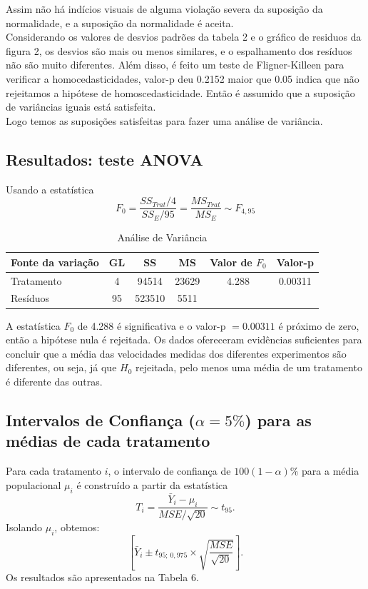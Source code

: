 \documentclass[12pt]{article}
\begin{document}
Assim não há indícios visuais de alguma violação severa da suposição da normalidade, e a suposição da normalidade é aceita.\\
Considerando os valores de desvios padrões da tabela 2 e o gráfico de residuos da figura 2, 
os desvios são mais ou menos similares, e o espalhamento dos resíduos não são muito diferentes.
Além disso, é feito um teste de Fligner-Killeen para verificar a homocedasticidades, valor-p deu 0.2152 maior que 0.05 indica que não rejeitamos a hipótese de homoscedasticidade.
Então é assumido que a suposição de variâncias iguais está satisfeita.
\\
Logo temos as suposições satisfeitas para fazer uma análise de variância. 

\subsection*{Resultados: teste ANOVA}
Usando a estatística 
    \[
    F_0 = \frac{SS_{Trat}/4}{SS_{E}/95} = \frac{MS_{Trat}}{MS_{E}} \sim F_{4,95}
    \]

\begin{table}[ht]
\centering
\begin{tabular}{lccccc}
\toprule
Fonte da variação& GL & SS & MS & Valor de $F_0$ & Valor-p \\
\midrule
Tratamento & 4 & 94514 & 23629 & 4.288 & 0.00311 \\
Resíduos & 95 & 523510 & 5511 \\
\bottomrule
\end{tabular}
\caption{Análise de Variância}
\end{table}

A estatística $F_0$ de 4.288 é significativa e o valor-p $= 0.00311$ é próximo de zero,
então a hipótese nula é rejeitada.
Os dados ofereceram evidências suficientes para concluir que a média das velocidades medidas
dos diferentes experimentos são diferentes, ou seja, já que $H_0$ rejeitada, pelo menos uma média
de um tratamento é diferente das outras.

\subsection*{Intervalos de Confiança ($\alpha = 5\%$) para as médias de cada tratamento}

Para cada tratamento \(i\), o intervalo de confiança de \(100(1-\alpha)\%\) 
para a média populacional \(\mu_i\) é construído a partir da estatística
\[
T_i = \frac{\bar{Y}_i - \mu_i}{MSE / \sqrt{20}} \sim t_{95}.
\]
Isolando \(\mu_i\), obtemos:
\[
\left[ \bar{Y}_i \pm t_{95;\,0,975} \times \sqrt{\frac{MSE}{\sqrt{20}}} \right].
\]
Os resultados são apresentados na Tabela 6.
\end{document}

